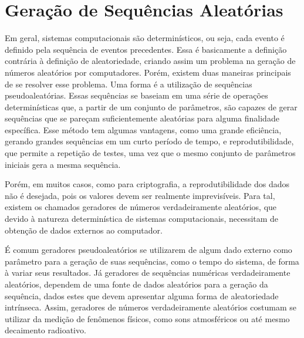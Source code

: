 \section{Geração de Sequências Aleatórias}
Em geral, sistemas computacionais são determinísticos, ou seja, cada evento é definido pela sequência de eventos precedentes. Essa é basicamente a definição contrária à definição de aleatoriedade, criando assim um problema na geração de números aleatórios por computadores. Porém, existem duas maneiras principais de se resolver esse problema.
Uma forma é a utilização de sequências pseudoaleatórias. Essas sequências se baseiam em uma série de operações determinísticas que, a partir de um conjunto de parâmetros, são capazes de gerar sequências que se pareçam suficientemente aleatórias para alguma finalidade específica. Esse método tem algumas vantagens, como uma grande eficiência, gerando grandes sequências em um curto período de tempo, e reprodutibilidade, que permite a repetição de testes, uma vez que o mesmo conjunto de parâmetros iniciais gera a mesma sequência.

Porém, em muitos casos, como para criptografia, a reprodutibilidade dos dados não é desejada, pois os valores devem ser realmente imprevisíveis. Para tal, existem os chamados geradores de números verdadeiramente aleatórios, que devido à natureza determinística de sistemas computacionais, necessitam de obtenção de dados externos ao computador.
 
É comum geradores pseudoaleatórios se utilizarem de algum dado externo como parâmetro para a geração de suas sequências, como o tempo do sistema, de forma à variar seus resultados. Já geradores de sequências numéricas verdadeiramente aleatórios, dependem de uma fonte de dados aleatórios para a geração da sequência, dados estes que devem apresentar alguma forma de aleatoriedade intrínseca. Assim, geradores de números verdadeiramente aleatórios costumam se utilizar da medição de fenômenos físicos, como sons atmosféricos ou até mesmo decaimento radioativo.
